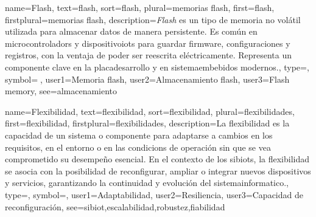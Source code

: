 	
	{
		name={Flash},
		text={flash},
		sort={flash},
		plural={memorias flash},
		first={flash},
		firstplural={memorias flash},
		description={\emph{Flash} es un tipo de memoria no vol{\'a}til utilizada para almacenar \glspl{dato} de manera persistente. Es com{\'u}n en \glspl{microcontrolador} y \glspl{dispositivoiot} para guardar firmware, configuraciones y registros, con la ventaja de poder ser reescrita el{\'e}ctricamente. Representa un componente clave en la \gls{placadesarrollo} y en \glspl{sistemaembebido} modernos.},
		type=\glsdefaulttype,
		symbol={💾},
		user1={Memoria flash},
		user2={Almacenamiento flash},
		user3={Flash memory},
		see={almacenamiento}
	}
	
	{
		name={Flexibilidad},
		text={flexibilidad},
		sort={flexibilidad},
		plural={flexibilidades},
		first={flexibilidad},
		firstplural={flexibilidades},
		description={La flexibilidad es la capacidad de un \gls{sistema} o \gls{componente} para adaptarse a cambios en los \glspl{requisito}, en el \gls{entorno} o en las \glspl{condicion} de operaci{\'o}n sin que se vea comprometido su desempe{\~n}o esencial. En el contexto de los \glspl{sibiot}, la flexibilidad se asocia con la posibilidad de reconfigurar, ampliar o integrar nuevos \glspl{dispositivo} y \glspl{servicio}, garantizando la continuidad y evoluci{\'o}n del \gls{sistemainformatico}.},
		type=\glsdefaulttype,
		symbol={},
		user1={Adaptabilidad},
		user2={Resiliencia},
		user3={Capacidad de reconfiguraci{\'o}n},
		see={sibiot,escalabilidad,robustez,fiabilidad}
	}
	
